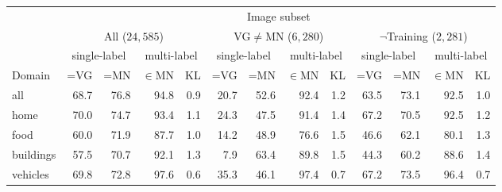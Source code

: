 \begin{table*}
	\centering
	\small
	\begin{tabular}{l@{~}|@{~}r@{~}r@{~}rr@{~}|@{~}r@{~}r@{~}rr@{~}|@{~}r@{~}r@{~}rr}
		\toprule
		& \multicolumn{12}{c}{Image subset} \\
		&	\multicolumn{4}{c}{All ($24,585$)} 
		& \multicolumn{4}{c}{VG$\neq$MN ($6,280$)}
		& \multicolumn{4}{c}{$\neg$Training ($2,281$)} \\
		\midrule
		&  \multicolumn{2}{c}{single-label}
		&  \multicolumn{2}{c}{multi-label}
		&  \multicolumn{2}{c}{single-label}
		&  \multicolumn{2}{c}{multi-label}
		&  \multicolumn{2}{c}{single-label}
		&  \multicolumn{2}{c}{multi-label} \\
		Domain	 &  =VG & =MN & $\in$MN  &  KL
		&  =VG & =MN & $\in$MN  & KL
		&  =VG & =MN & $\in$MN  & KL\\ 
		\midrule \vspace{.6ex}
		all            &               68.7 &                 76.8 &                   94.8 &            0.9 &            20.7 &              52.6 &                92.4 &         1.2 &             63.5 &               73.1 &                 92.5 &          1.0 \\ 
		home           &               70.0 &                 74.7 &                   93.4 &            1.1 &            24.3 &              47.5 &                91.4 &         1.4 &             67.2 &               70.5 &                 92.5 &          1.2 \\
		food           &               60.0 &                 71.9 &                   87.7 &            1.0 &            14.2 &              48.9 &                76.6 &         1.5 &             46.6 &               62.1 &                 80.1 &          1.3 \\
		buildings      &               57.5 &                 70.7 &                   92.1 &            1.3 &             7.9 &              63.4 &                89.8 &         1.5 &             44.3 &               60.2 &                 88.6 &          1.4 \\
		vehicles       &               69.8 &                 72.8 &                   97.6 &            0.6 &            35.3 &              46.1 &                97.4 &         0.7 &             67.2 &               73.5 &                 96.4 &          0.7 \\

\end{tabular}
\end{table*}
